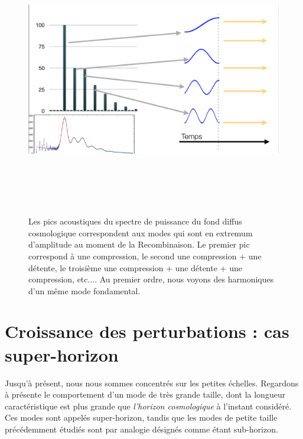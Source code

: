 \begin{figure}[htbp]
	\centering
		\includegraphics[height=12cm]{figs/bao2.png}
	\caption[Les pics acoustiques sont des extrema]{Les pics acoustiques du spectre de puissance du fond diffus cosmologique correspondent aux modes qui sont en extremum d'amplitude au moment de la Recombinaison. Le premier pic correspond à une compression, le second une compression + une détente, le troisième une compression + une détente + une compression, etc.... Au premier ordre, nous voyons des harmoniques d'un même mode fondamental. }
	\label{f:bao2}
\end{figure}

\section{Croissance des perturbations : cas super-horizon}

Jusqu'à présent, nous nous sommes concentrés sur les petites échelles. Regardons à présente le comportement d'un mode de très grande taille, dont la longueur caractéristique est plus grande que \textit{l'horizon cosmologique} à l'instant considéré. Ces modes sont appelés super-horizon, tandis que les modes de petite taille précédemment étudiés sont par analogie désignés comme étant sub-horizon.

